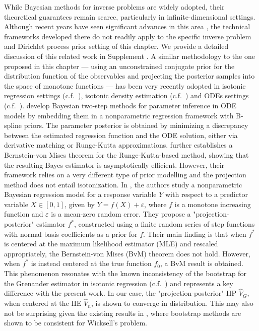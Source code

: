 While Bayesian methods for inverse problems are widely adopted, their theoretical guarantees remain scarce, particularly in infinite-dimensional settings. Although recent years have seen significant advances in this area \cite{62,35,37,41,36,44,38,39,40,42,26,43}, the technical frameworks developed there do not readily apply to the specific inverse problem and Dirichlet process prior setting of this chapter. We provide a detailed discussion of this related work in Supplement \cite{64}. A similar methodology to the one proposed in this chapter --- using an unconstrained conjugate prior for the distribution function of the observables and projecting the posterior samples into the space of monotone functions --- has been very recently adopted in isotonic regression settings (c.f.\ \cite{54,55,56}), isotonic density estimation (c.f.\ \cite{60}) and ODEs settings (c.f.\ \cite{57,58}). \cite{57,58} develop Bayesian two-step methods for parameter inference in ODE models by embedding them in a nonparametric regression framework with B-spline priors. The parameter posterior is obtained by minimizing a discrepancy between the estimated regression function and the ODE solution, either via derivative matching or Runge-Kutta approximations. \cite{58} further establishes a Bernstein-von Mises theorem for the Runge-Kutta-based method, showing that the resulting Bayes estimator is asymptotically efficient. However, their framework relies on a very different type of prior modelling and the projection method does not entail isotonization. In \cite{54}, the authors study a nonparametric Bayesian regression model for a response variable \( Y \) with respect to a predictor variable \( X \in [0,1] \), given by \( Y = f(X) + \varepsilon \), where \( f \) is a monotone increasing function and \( \varepsilon \) is a mean-zero random error. They propose a "projection-posterior" estimator \( f^* \), constructed using a finite random series of step functions with normal basis coefficients as a prior for \( f \). Their main finding is that when \( f^* \) is centered at the maximum likelihood estimator (MLE) and rescaled appropriately, the Bernstein-von Mises (BvM) theorem does not hold. However, when \( f^* \) is instead centered at the true function \( f_0 \), a BvM result is obtained. This phenomenon resonates with the known inconsistency of the bootstrap for the Grenander estimator in isotonic regression (c.f.\ \cite{63}) and represents a key difference with the present work. In our case, the "projection-posterior" IIP \( \hat{V}_{\scriptscriptstyle{G}} \), when centered at the IIE \( \hat{V}_n \), is shown to converge in distribution.  This may also not be surprising given the existing results in \cite{19}, where bootstrap methods are shown to be consistent for Wicksell's problem. 

